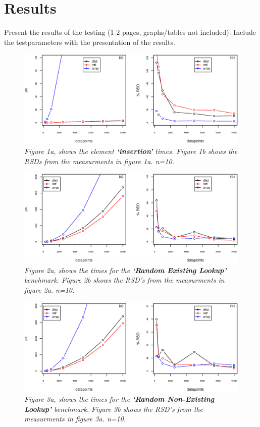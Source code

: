 \documentclass[a4paper,11pt,twoside]{article}
\begin{document}
\section{Results}
Present the results of the testing (1-2 pages, graphs/tables not
included). Include the testparameters with the presentation of the
results.
\begin{figure}[H] 
\centering 
\includegraphics[width=\textwidth]{figures/fig1.eps}
\caption{\textit{Figure 1a, shows the element \textbf{`insertion'}
    times. Figure 1b shows the RSDs from the measurments in figure 1a. n=10.}}
\end{figure}

\begin{figure}[H] 
\centering 
\includegraphics[width=\textwidth]{figures/fig2.eps}
\caption{\textit{Figure 2a, shows the times for the \textbf{`Random Existing
    Lookup'} benchmark. Figure 2b shows the RSD's from the measurments
in figure 2a. n=10.}}
\end{figure}

\begin{figure}[H] 
\centering 
\includegraphics[width=\textwidth]{figures/fig3.eps}
\caption{\textit{Figure 3a, shows the times for the \textbf{`Random
      Non-Existing Lookup'} benchmark. Figure 3b shows the RSD's from
    the measurments in figure 3a. n=10.}}
\end{figure}
\end{document}
